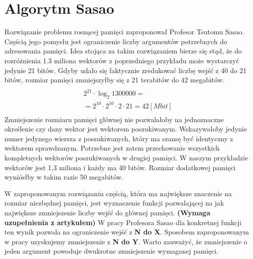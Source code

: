 \section{Algorytm Sasao}
Rozwiązanie problemu rosnącej pamięci zaproponował Profesor Tsutomu Sasao.
Częścią jego pomysłu jest ograniczenie liczby argumentów potrzebnych do adresowania pamięci.
Idea stojąca za takim rozwiązaniem bierze się stąd, że do rozróżnienia 1.3 miliona wektorów z poprzedniego przykładu może wystarczyć jedynie 21 bitów.
Gdyby udało się faktycznie zredukować liczbę wejść z 40 do 21 bitów, rozmiar pamięci zmniejszyłby się z 21 terabitów do 42 megabitów.
\begin{multline} \\
2^{21} \cdot \log_2 1300000 = \\
= 2^{10} \cdot 2^{10} \cdot 2 \cdot 21 = 42 [Mbit] \\
\end{multline}
Zmniejszenie rozmiaru pamięci głównej nie pozwalałoby na jednoznaczne określenie czy dany wektor jest wektorem poszukiwanym.
Wskazywałoby jedynie numer jedynego wiersza z poszukiwanych, który ma szansę być identyczny z wektorem sprawdzanym.
Potrzebne jest zatem przechowanie wszystkich kompletnych wektorów poszukiwanych w drugiej pamięci.
W naszym przykładzie wektorów jest 1,3 miliona i każdy ma 40 bitów.
Rozmiar dodatkowej pamięci wyniósłby w takim razie 50 megabitów.

W zaproponowanym rozwiązaniu częścią, która ma największe znaczenie na rozmiar niezbędnej pamięci,
jest wyznaczenie funkcji pozwalającej na jak największe zmniejszenie liczby wejść do głównej pamięci.
\textbf{(Wymaga uzupełnienia z artykułem)} W pracy Profesora Sasao dla konkretnej funkcji ten wynik pozwala na ograniczenie wejść z \textbf{N do X}.
Sposobem zaproponowanym w pracy uzyskujemy zmniejszenie z \textbf{N do Y}.
Warto zauważyć, że zmniejszenie o jeden argument powoduje dwukrotne zmniejszenie wymaganej pamięci.
